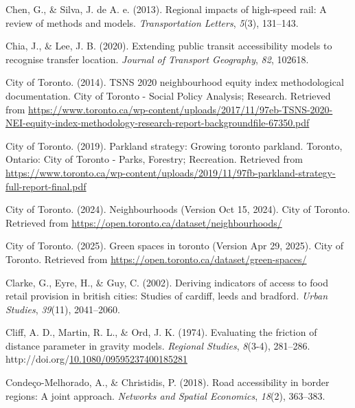 \documentclass[
11pt, %
oneside, %
english, %
singlespacing, %
]{macthesis} %
\newlength{\cslhangindent}
\newenvironment{CSLReferences}[2] %
{\begin{list}{}{%
	\setlength{\itemindent}{0pt}
	\setlength{\leftmargin}{0pt}
	\setlength{\parsep}{0pt}
	\ifodd #1
	\setlength{\leftmargin}{\cslhangindent}
	\setlength{\itemindent}{-1\cslhangindent}
	\fi
	\setlength{\itemsep}{#2\baselineskip}}}
{\end{list}}
\begin{document}
\begin{CSLReferences}{1}{0}
Chen, G., \& Silva, J. de A. e. (2013). Regional impacts of high-speed rail: A review of methods and models. \emph{Transportation Letters}, \emph{5}(3), 131--143.

Chia, J., \& Lee, J. B. (2020). Extending public transit accessibility models to recognise transfer location. \emph{Journal of Transport Geography}, \emph{82}, 102618.

City of Toronto. (2014). TSNS 2020 neighbourhood equity index methodological documentation. City of Toronto - Social Policy Analysis; Research. Retrieved from \url{https://www.toronto.ca/wp-content/uploads/2017/11/97eb-TSNS-2020-NEI-equity-index-methodology-research-report-backgroundfile-67350.pdf}

City of Toronto. (2019). Parkland strategy: Growing toronto parkland. Toronto, Ontario: City of Toronto - Parks, Forestry; Recreation. Retrieved from \url{https://www.toronto.ca/wp-content/uploads/2019/11/97fb-parkland-strategy-full-report-final.pdf}

City of Toronto. (2024). Neighbourhoods (Version Oct 15, 2024). City of Toronto. Retrieved from \url{https://open.toronto.ca/dataset/neighbourhoods/}

City of Toronto. (2025). Green spaces in toronto (Version Apr 29, 2025). City of Toronto. Retrieved from \url{https://open.toronto.ca/dataset/green-spaces/}

Clarke, G., Eyre, H., \& Guy, C. (2002). Deriving indicators of access to food retail provision in british cities: Studies of cardiff, leeds and bradford. \emph{Urban Studies}, \emph{39}(11), 2041--2060.

Cliff, A. D., Martin, R. L., \& Ord, J. K. (1974). Evaluating the friction of distance parameter in gravity models. \emph{Regional Studies}, \emph{8}(3-4), 281--286. http://doi.org/\href{https://doi.org/10.1080/09595237400185281}{10.1080/09595237400185281}

Condeço-Melhorado, A., \& Christidis, P. (2018). Road accessibility in border regions: A joint approach. \emph{Networks and Spatial Economics}, \emph{18}(2), 363--383.


\end{CSLReferences}
\end{document}
